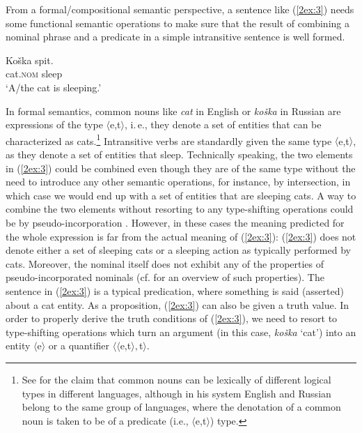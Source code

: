 \documentclass[output=paper]{langsci/langscibook}
\begin{document}
{
From a formal/compositional semantic perspective, a sentence like (\ref{2ex:3}) needs some functional semantic operations to make sure that the result of combining a nominal phrase and a predicate in a simple intransitive sentence is well formed.
}

\begin{exe}
\ex\label{2ex:3} 
\gll Ko\v{s}ka spit.\\
cat.{\textsc{nom}} sleep\\
\glt `A/the cat is sleeping.'
\end{exe}


In formal semantics, common nouns like {\emph{cat}} in English or {\emph{ko\v{s}ka}} in Russian are expressions of the type $\langle$e,t$\rangle$, i.\,e., they denote a set of entities that can be characterized as cats.\footnote{{See \cite{chierchia:98} for the claim that common nouns can be lexically of different logical types in different languages, although in his system English and Russian belong to the same group of languages, where the denotation of a common noun is taken to be of a predicate (i.e., $\langle$e,t$\rangle$) type.}}
Intransitive verbs are standardly given the same type $\langle$e,t$\rangle$, as they denote a set of entities that sleep. Technically speaking, the two elements in (\ref{2ex:3}) could be combined even though they are of the same type without the need to introduce any other semantic operations, for instance, by intersection, in which case we would end up with a set of entities that are sleeping cats. A way to combine the two elements without resorting to any type-shifting operations could be by pseudo-incorporation \citep[e.\,g.,][]{mithun:84}. However, in these cases the meaning predicted for the whole expression is far from the actual meaning of (\ref{2ex:3}): (\ref{2ex:3}) does not denote either a set of sleeping cats or a sleeping action as typically performed by cats. Moreover, the nominal itself does not exhibit any of the properties of pseudo-incorporated nominals (cf. \citealt{borik:gehrke:15} for an overview of such properties). The sentence in (\ref{2ex:3}) is a typical predication, where something is said (asserted) about a cat entity. As a proposition, (\ref{2ex:3}) can also be given a truth value. In order to properly derive the truth conditions of (\ref{2ex:3}), we need to resort to type-shifting operations \citep{chierchia:84,partee:87} which turn an argument (in this case, {\emph{ko\v{s}ka}} `cat') into an entity $\langle$e$\rangle$ or a quantifier $\langle$$\langle$e,t$\rangle,$t$\rangle$. 
\end{document}

